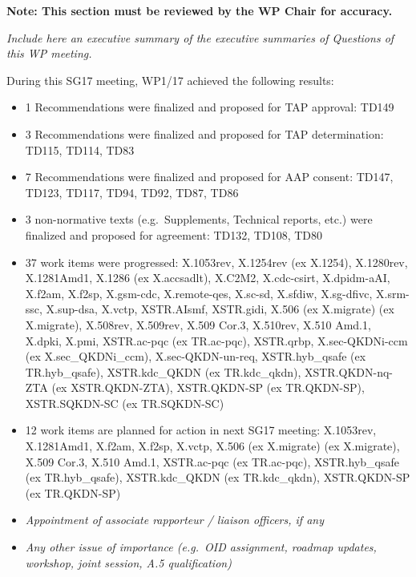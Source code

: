 \textbf{Note: This section must be reviewed by the WP Chair for accuracy.}

\textit{Include here an executive summary of the executive summaries of Questions of this WP meeting.}

During this SG17 meeting, WP1/17 achieved the following results:

\begin{itemize}
  \item 1 Recommendations were finalized and proposed for TAP approval: TD149
  \item 3 Recommendations were finalized and proposed for TAP determination: TD115, TD114, TD83
  \item 7 Recommendations were finalized and proposed for AAP consent: TD147, TD123, TD117, TD94, TD92, TD87, TD86
  \item 3 non-normative texts (e.g.\ Supplements, Technical reports, etc.) were finalized and proposed for agreement: TD132, TD108, TD80
  \item 37 work items were progressed: X.1053rev, X.1254rev (ex X.1254), X.1280rev, X.1281Amd1, X.1286 (ex X.accsadlt), X.C2M2, X.cdc-csirt, X.dpidm-aAI, X.f2am, X.f2sp, X.gsm-cdc, X.remote-qes, X.sc-sd, X.sfdiw, X.sg-dfivc, X.srm-ssc, X.sup-dsa, X.vctp, XSTR.AIsmf, XSTR.gidi, X.506 (ex X.migrate) (ex X.migrate), X.508rev, X.509rev, X.509 Cor.3, X.510rev, X.510 Amd.1, X.dpki, X.pmi, XSTR.ac-pqc (ex TR.ac-pqc), XSTR.qrbp, X.sec-QKDNi-ccm (ex X.sec_QKDNi_ccm), X.sec-QKDN-un-req, XSTR.hyb_qsafe (ex TR.hyb_qsafe), XSTR.kdc_QKDN (ex TR.kdc_qkdn), XSTR.QKDN-nq-ZTA (ex XSTR.QKDN-ZTA), XSTR.QKDN-SP (ex TR.QKDN-SP), XSTR.SQKDN-SC (ex TR.SQKDN-SC)
  \item 12 work items are planned for action in next SG17 meeting: X.1053rev, X.1281Amd1, X.f2am, X.f2sp, X.vctp, X.506 (ex X.migrate) (ex X.migrate), X.509 Cor.3, X.510 Amd.1, XSTR.ac-pqc (ex TR.ac-pqc), XSTR.hyb_qsafe (ex TR.hyb_qsafe), XSTR.kdc_QKDN (ex TR.kdc_qkdn), XSTR.QKDN-SP (ex TR.QKDN-SP)
  \item \textit{Appointment of associate rapporteur / liaison officers, if any}
  \item \textit{Any other issue of importance (e.g.\ OID assignment, roadmap updates, workshop, joint session, A.5 qualification)}
\end{itemize}